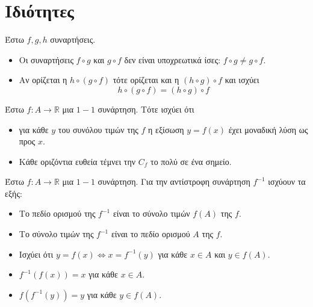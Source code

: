 \section{Ιδιότητες}
Έστω $f,g,h$ συναρτήσεις.
\begin{itemize}
\item Οι συναρτήσεις $f\circ g$ και $g\circ f$ δεν είναι υποχρεωτικά ίσες: $f\circ g\neq g\circ f$.
\item Αν ορίζεται η $h\circ(g\circ f)$ τότε ορίζεται και η $(h\circ g)\circ f$ και ισχύει
\[ h\circ(g\circ f)=(h\circ g)\circ f \]
\end{itemize}

Έστω $f:A\to \mathbb{R} $ μια $1-1$ συνάρτηση. Τότε ισχύει ότι
\begin{itemize}
\item για κάθε $y$ του συνόλου τιμών της $f$ η εξίσωση $y=f(x)$ έχει μοναδική λύση ως προς $x$.
\item Κάθε οριζόντια ευθεία τέμνει την $C_f$ το πολύ σε ένα σημείο.
\end{itemize}

Έστω $f:A\to\mathbb{R}$ μια $1-1$ συνάρτηση. Για την αντίστροφη συνάρτηση $f^{-1}$ ισχύουν τα εξής:
\begin{itemize}[itemsep=0mm]
\item Το πεδίο ορισμού της $ f^{-1} $ είναι το σύνολο τιμών $ f(A) $ της $ f $.
\item Το σύνολο τιμών της $ f^{-1} $ είναι το πεδίο ορισμού $ A $ της $ f $.
\item Ισχύει ότι $ y=f(x)\Leftrightarrow x=f^{-1}(y) $ για κάθε $x\in A$ και $ y\in f(A) $.
\item $f^{-1}(f(x))=x$ για κάθε $x\in A$.
\item $f(f^{-1}(y))=y$ για κάθε $y\in f(A)$.
\end{itemize}

